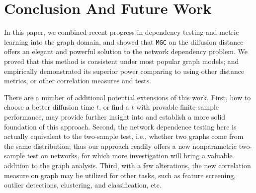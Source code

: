 \documentclass[11pt]{article}
\theoremstyle{definition}
\begin{document}
\vspace*{-0.5cm}
\section{Conclusion And Future Work}
\label{sec:conc}
	\vspace*{-0.2cm}
In this paper, we combined recent progress in dependency testing and metric learning into the graph domain, and showed that \texttt{MGC} on the diffusion distance offers an elegant and powerful solution to the network dependency problem. We proved that this method is consistent under most popular graph models; and empirically demonstrated its superior power comparing to using other distance metrics, or other correlation measures and tests.

There are a number of additional potential extensions of this work. First, how to choose a better diffusion time $t$, or find a $t$ with provable finite-sample performance, may provide further insight into and establish a more solid foundation of this approach. Second, the network dependence testing here is actually equivalent to the two-sample test, i.e., whether two graphs come from the same distribution; thus our approach readily offers a new nonparametric two-sample test on networks, for which more investigation will bring a valuable addition to the graph analysis. Third, with a few alterations, the new correlation measure on graph may be utilized for other tasks, such as feature screening, outlier detections, clustering, and classification, etc.

\end{document}
